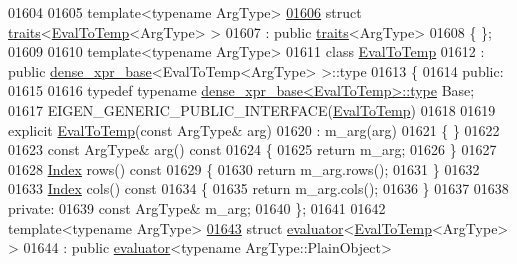 \begin{DoxyCode}
01604 
01605 \textcolor{keyword}{template}<\textcolor{keyword}{typename} ArgType>
\hyperlink{struct_eigen_1_1internal_1_1traits_3_01_eval_to_temp_3_01_arg_type_01_4_01_4}{01606} \textcolor{keyword}{struct }\hyperlink{struct_eigen_1_1internal_1_1traits}{traits}<\hyperlink{class_eigen_1_1internal_1_1_eval_to_temp}{EvalToTemp}<ArgType> >
01607   : \textcolor{keyword}{public} \hyperlink{struct_eigen_1_1internal_1_1traits}{traits}<ArgType>
01608 \{ \};
01609 
01610 \textcolor{keyword}{template}<\textcolor{keyword}{typename} ArgType>
01611 \textcolor{keyword}{class }\hyperlink{class_eigen_1_1internal_1_1_eval_to_temp}{EvalToTemp}
01612   : \textcolor{keyword}{public} \hyperlink{struct_eigen_1_1internal_1_1dense__xpr__base}{dense\_xpr\_base}<EvalToTemp<ArgType> >::type
01613 \{
01614  \textcolor{keyword}{public}:
01615  
01616   \textcolor{keyword}{typedef} \textcolor{keyword}{typename} \hyperlink{struct_eigen_1_1internal_1_1dense__xpr__base}{dense\_xpr\_base<EvalToTemp>::type} Base;
01617   EIGEN\_GENERIC\_PUBLIC\_INTERFACE(\hyperlink{class_eigen_1_1internal_1_1_eval_to_temp}{EvalToTemp})
01618  
01619   \textcolor{keyword}{explicit} \hyperlink{class_eigen_1_1internal_1_1_eval_to_temp}{EvalToTemp}(\textcolor{keyword}{const} ArgType& arg)
01620     : m\_arg(arg)
01621   \{ \}
01622  
01623   \textcolor{keyword}{const} ArgType& arg()\textcolor{keyword}{ const}
01624 \textcolor{keyword}{  }\{
01625     \textcolor{keywordflow}{return} m\_arg;
01626   \}
01627 
01628   \hyperlink{namespace_eigen_a62e77e0933482dafde8fe197d9a2cfde}{Index} rows()\textcolor{keyword}{ const }
01629 \textcolor{keyword}{  }\{
01630     \textcolor{keywordflow}{return} m\_arg.rows();
01631   \}
01632 
01633   \hyperlink{namespace_eigen_a62e77e0933482dafde8fe197d9a2cfde}{Index} cols()\textcolor{keyword}{ const }
01634 \textcolor{keyword}{  }\{
01635     \textcolor{keywordflow}{return} m\_arg.cols();
01636   \}
01637 
01638  \textcolor{keyword}{private}:
01639   \textcolor{keyword}{const} ArgType& m\_arg;
01640 \};
01641  
01642 \textcolor{keyword}{template}<\textcolor{keyword}{typename} ArgType>
\hyperlink{struct_eigen_1_1internal_1_1evaluator_3_01_eval_to_temp_3_01_arg_type_01_4_01_4}{01643} \textcolor{keyword}{struct }\hyperlink{struct_eigen_1_1internal_1_1evaluator}{evaluator}<\hyperlink{class_eigen_1_1internal_1_1_eval_to_temp}{EvalToTemp}<ArgType> >
01644   : \textcolor{keyword}{public} \hyperlink{struct_eigen_1_1internal_1_1evaluator}{evaluator}<typename ArgType::PlainObject>

\end{DoxyCode}

